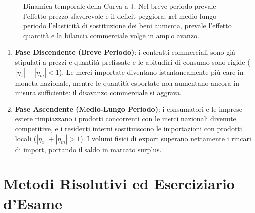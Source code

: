 \begin{figure}[htbp]
\caption{Dinamica temporale della Curva a J. Nel breve periodo prevale l'effetto prezzo sfavorevole e il deficit peggiora; nel medio-lungo periodo l'elasticità di sostituzione dei beni aumenta, prevale l'effetto quantità e la bilancia commerciale volge in ampio avanzo.}
\label{fig:curva_j}
\end{figure}

\begin{osservazione}
\begin{enumerate}
    \item \textbf{Fase Discendente (Breve Periodo)}: i contratti commerciali sono già stipulati a prezzi e quantità prefissate e le abitudini di consumo sono rigide ($|\eta_x| + |\eta_m| < 1$). Le merci importate diventano istantaneamente più care in moneta nazionale, mentre le quantità esportate non aumentano ancora in misura sufficiente: il disavanzo commerciale si aggrava.
    \item \textbf{Fase Ascendente (Medio-Lungo Periodo)}: i consumatori e le imprese estere rimpiazzano i prodotti concorrenti con le merci nazionali divenute competitive, e i residenti interni sostituiscono le importazioni con prodotti locali ($|\eta_x| + |\eta_m| > 1$). I volumi fisici di export superano nettamente i rincari di import, portando il saldo in marcato surplus.
\end{enumerate}
\end{osservazione}

\section{Metodi Risolutivi ed Eserciziario d'Esame}

